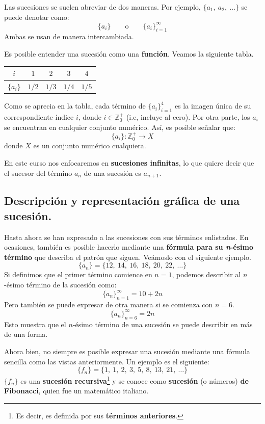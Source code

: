 \documentclass[12pt]{article}
\begin{document}
Las sucesiones se suelen abreviar de dos maneras. Por ejemplo, $\{a_{1}, \ a_{2}, \ \ldots \}$ se puede denotar como:
\[
  \{a_{i}\} \qquad \text{o} \qquad \{a_{i}\}_{i = 1}^{\infty}
\]
Ambas se usan de manera intercambiada.

Es posible entender una sucesión como una \textbf{función}. Veamos la siguiente tabla.

\begin{table}[hbt!]
\centering

\begin{tabular}{c|c c c c}
$i$ & $1$ & $2$ & $3$ & $4$ \\
\hline
$\{a_{i}\}$ & $1/2$ & $1/3$ & $1/4$ & $1/5$
\end{tabular}

\end{table}

Como se aprecia en la tabla, cada término de $\{a_{i}\}_{i = 1}^{4}$ es la imagen única de su correspondiente índice $i$, donde $i \in \mathbb{Z}_{0}^{+}$ (i.e, incluye al cero). Por otra parte, los $a_{i}$ se encuentran en cualquier conjunto numérico. Así, es posible señalar que:
\[
  \{a_{i}\}: \mathbb{Z}_{0}^{+} \to X
\]
donde $X$ es un conjunto numérico cualquiera.

En este curso nos enfocaremos en \textbf{sucesiones infinitas}, lo que quiere decir que el sucesor del término $a_{n}$ de una sucesión es $a_{n + 1}$.

\subsection{Descripción y representación gráfica de una sucesión.}

Hasta ahora se han expresado a las sucesiones con sus términos enlistados. En ocasiones, también es posible hacerlo mediante una \textbf{fórmula para su \textit{n}-ésimo término} que describa el patrón que siguen. Veámoslo con el siguiente ejemplo.
\[
  \{a_{n}\} = \{12, \ 14, \ 16, \ 18, \ 20, \ 22, \ \ldots \}
\]
Si definimos que el primer término comience en $n = 1$, podemos describir al $n$-ésimo término de la sucesión como:
\[
  \{a_{n}\}_{n = 1}^{\infty} = 10 + 2n
\]
Pero también se puede expresar de otra manera si se comienza con $n = 6$.
\[
  \{a_{n}\}_{n = 6}^{\infty} = 2n
\]
Esto muestra que el $n$-ésimo término de una sucesión se puede describir en más de una forma.

Ahora bien, no siempre es posible expresar una sucesión mediante una fórmula sencilla como las vistas anteriormente. Un ejemplo es el siguiente:
\[
  \{f_{n}\} = \{1, \ 1, \ 2, \ 3, \ 5, \ 8, \ 13, \ 21, \ \ldots\}
\]
$\{f_{n}\}$ es una \textbf{sucesión recursiva}\footnote{Es decir, es definida por sus \textbf{términos anteriores}.} y se conoce como \textbf{sucesión} (o números) \textbf{de Fibonacci}, quien fue un matemático italiano.
\end{document}
